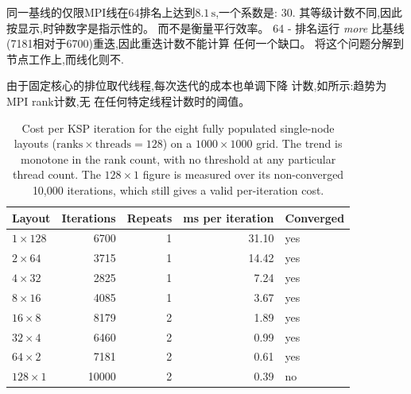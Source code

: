 \documentclass[11pt,a4paper,oneside]{report}
\begin{document}
同一基线的仅限MPI线在64排名上达到$8.1\,\text{s}$,一个系数是:
30. 其等级计数不同,因此按显示,时钟数字是指示性的。
而不是衡量平行效率。 64 - 排名运行 \emph{more}
比基线(7181相对于6700)重迭,因此重迭计数不能计算
任何一个缺口。 将这个问题分解到节点工作上,而线化则不.

由于固定核心的排位取代线程,每次迭代的成本也单调下降
计数,如所示:趋势为MPI rank计数,无
在任何特定线程计数时的阈值。

\begin{table}[htbp]
  \centering
  \caption{Cost per KSP iteration for the eight fully populated single-node layouts
  ($\text{ranks}\times\text{threads}=128$) on a $1000\times1000$ grid. The trend is
  monotone in the rank count, with no threshold at any particular thread count. The
  $128\times1$ figure is measured over its non-converged 10,000 iterations, which still
  gives a valid per-iteration cost.}
  \label{tab:fullnode-cost}
  \begin{tabular}{lrrrl}
    \toprule
    Layout & Iterations & Repeats & ms per iteration & Converged \\
    \midrule
    $1\times128$ &  6700 & 1 & 31.10 & yes \\
    $2\times64$  &  3715 & 1 & 14.42 & yes \\
    $4\times32$  &  2825 & 1 &  7.24 & yes \\
    $8\times16$  &  4085 & 1 &  3.67 & yes \\
    $16\times8$  &  8179 & 2 &  1.89 & yes \\
    $32\times4$  &  6460 & 2 &  0.99 & yes \\
    $64\times2$  &  7181 & 2 &  0.61 & yes \\
    $128\times1$ & 10000 & 2 &  0.39 & no \\
    \bottomrule
  \end{tabular}
\end{table}
\end{document}
